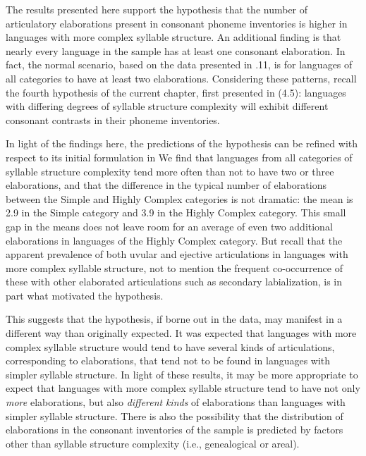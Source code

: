 \z


  The results presented here support the hypothesis that the number of articulatory elaborations present in consonant phoneme inventories is higher in languages with more complex syllable structure. An additional finding is that nearly every language in the sample has at least one consonant elaboration. In fact, the normal scenario, based on the data presented in .11, is for languages of all categories to have at least two elaborations. Considering these patterns, recall the fourth hypothesis of the current chapter, first presented in (4.5): languages with differing degrees of syllable structure complexity will exhibit different consonant contrasts in their phoneme inventories.



  In light of the findings here, the predictions of the hypothesis can be refined with respect to its initial formulation in  We find that languages from all categories of syllable structure complexity tend more often than not to have two or three elaborations, and that the difference in the typical number of elaborations between the Simple and Highly Complex categories is not dramatic: the mean is 2.9 in the Simple category and 3.9 in the Highly Complex category. This small gap in the means does not leave room for an average of even two additional elaborations in languages of the Highly Complex category. But recall that the apparent prevalence of both uvular and ejective articulations in languages with more complex syllable structure, not to mention the frequent co-occurrence of these with other elaborated articulations such as secondary labialization, is in part what motivated the hypothesis.



  This suggests that the hypothesis, if borne out in the data, may manifest in a different way than originally expected. It was expected that languages with more complex syllable structure would tend to have several kinds of articulations, corresponding to elaborations, that tend not to be found in languages with simpler syllable structure. In light of these results, it may be more appropriate to expect that languages with more complex syllable structure tend to have not only \textit{more} elaborations, but also \textit{different} \textit{kinds} of elaborations than languages with simpler syllable structure. There is also the possibility that the distribution of elaborations in the consonant inventories of the sample is predicted by factors other than syllable structure complexity (i.e., genealogical or areal).



